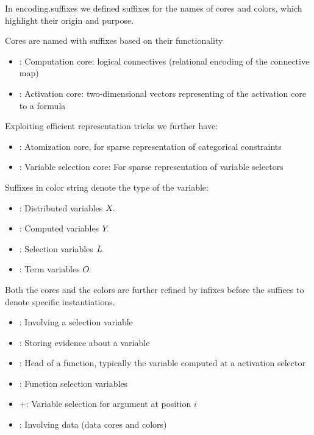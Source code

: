 
In encoding.suffixes we defined suffixes for the names of cores and colors, which highlight their origin and purpose.

Cores are named with suffixes based on their functionality
\begin{itemize}
	\item \comCoreSuf: Computation core: logical connectives (relational encoding of the connective map)
	\item \actCoreSuf: Activation core: two-dimensional vectors representing of the activation core to a formula
\end{itemize}

Exploiting efficient representation tricks we further have:
\begin{itemize}
	\item \atoCoreSuf: Atomization core, for sparse representation of categorical constraints
	\item \vselCoreSuf: Variable selection core: For sparse representation of variable selectors
\end{itemize}


Suffixes in color string denote the type of the variable:
\begin{itemize}
	\item \disVarSuf: Distributed variables $X_{\cdot}$
	\item \comVarSuf: Computed variables $Y_{\cdot}$
	\item \selVarSuf: Selection variables $L_{\cdot}$
	\item \terVarSuf: Term variables $O_{\cdot}$
\end{itemize}


Both the cores and the colors are further refined by infixes before the suffices to denote specific instantiations.

\begin{itemize}
	\item \selCoreIn: Involving a selection variable
	\item \eviCoreIn: Storing evidence about a variable
	\item \heaIn: Head of a function, typically the variable computed at a activation selector
	\item \funIn: Function selection variables
	\item \posIn+: Variable selection for argument at position $i$
	\item \datIn: Involving data (data cores and colors)
\end{itemize}

